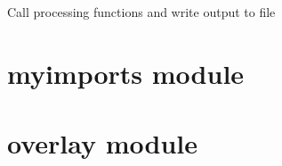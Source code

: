 \documentclass[letterpaper,10pt,english]{sphinxmanual}
\begin{document}
\begin{fulllineitems}
\label{\detokenize{main:main.main}}
Call processing functions and write output to file

\end{fulllineitems}



\section{myimports module}
\label{\detokenize{myimports:module-myimports}}\label{\detokenize{myimports::doc}}\label{\detokenize{myimports:myimports-module}}

\section{overlay module}
\label{\detokenize{overlay::doc}}\label{\detokenize{overlay:overlay-module}}\label{\detokenize{overlay:module-overlay}}
\end{document}
